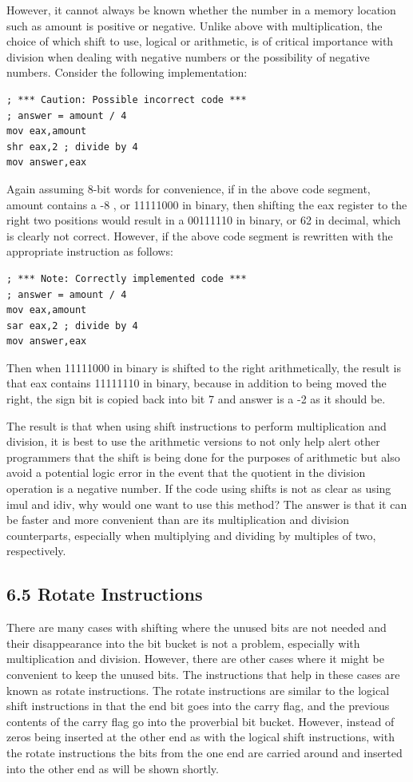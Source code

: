 \documentclass[10pt]{book}
\begin{document}
However, it cannot always be known whether the number in a memory location such as amount is positive or negative. Unlike above with multiplication, the choice of which shift to use, logical or arithmetic, is of critical importance with division when dealing with negative numbers or the possibility of negative numbers. Consider the following implementation:

\begin{verbatim}
; *** Caution: Possible incorrect code ***
; answer = amount / 4
mov eax,amount
shr eax,2 ; divide by 4
mov answer,eax
\end{verbatim}

Again assuming 8-bit words for convenience, if in the above code segment, amount contains a -8 , or 11111000 in binary, then shifting the eax register to the right two positions would result in a 00111110 in binary, or 62 in decimal, which is clearly not correct. However, if the above code segment is rewritten with the appropriate instruction as follows:


\begin{verbatim}
; *** Note: Correctly implemented code ***
; answer = amount / 4
mov eax,amount
sar eax,2 ; divide by 4
mov answer,eax
\end{verbatim}

Then when 11111000 in binary is shifted to the right arithmetically, the result is that eax contains 11111110 in binary, because in addition to being moved the right, the sign bit is copied back into bit 7 and answer is a -2 as it should be.

The result is that when using shift instructions to perform multiplication and division, it is best to use the arithmetic versions to not only help alert other programmers that the shift is being done for the purposes of arithmetic but also avoid a potential logic error in the event that the quotient in the division operation is a negative number. If the code using shifts is not as clear as using imul and idiv, why would one want to use this method? The answer is that it can be faster and more convenient than are its multiplication and division counterparts, especially when multiplying and dividing by multiples of two, respectively.

\subsection*{6.5 Rotate Instructions}
There are many cases with shifting where the unused bits are not needed and their disappearance into the bit bucket is not a problem, especially with multiplication and division. However, there are other cases where it might be convenient to keep the unused bits. The instructions that help in these cases are known as rotate instructions. The rotate instructions are similar to the logical shift instructions in that the end bit goes into the carry flag, and the previous contents of the carry flag go into the proverbial bit bucket. However, instead of zeros being inserted at the other end as with the logical shift instructions, with the rotate instructions the bits from the one end are carried around and inserted into the other end as will be shown shortly.
\end{document}
